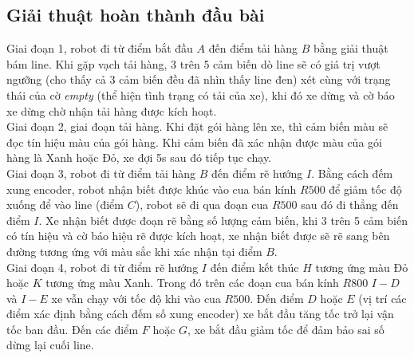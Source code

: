           \subsection{Giải thuật hoàn thành đầu bài}
               \hspace*{0.6cm}Giai đoạn 1, robot đi từ điểm bắt đầu $A$ đến điểm tải hàng $B$ bằng giải thuật bám line. Khi gặp vạch tải hàng, 3 trên 5 cảm biến dò line sẽ có giá trị vượt ngưỡng (cho thấy cả 3 cảm biến đều đã nhìn thấy line đen)
               xét cùng với trạng thái của cờ \textit{empty} (thể hiện tình trạng có tải của xe), khi đó xe dừng và cờ báo xe dừng chờ nhận tải hàng được kích hoạt.\\
               \hspace*{0.6cm}Giai đoạn 2, giai đoạn tải hàng. Khi đặt gói hàng lên xe, thì cảm biến màu sẽ đọc
               tín hiệu màu của gói hàng. Khi cảm biến đã xác nhận được màu của gói hàng là Xanh hoặc
               Đỏ, xe đợi 5s sau đó tiếp tục chạy.\\
               \hspace*{0.6cm}Giai đoạn 3, robot đi từ điểm tải hàng $B$ đến điểm rẽ hướng $I$. Bằng cách đếm xung encoder, robot nhận biết được khúc vào cua bán kính $R500$ để giảm tốc độ xuống để vào line (điểm $C$), robot sẽ đi qua đoạn cua $R500$ sau đó đi thẳng đến điểm $I$. Xe nhận biết
               được đoạn rẽ bằng số lượng cảm biến, khi 3 trên 5 cảm biến có tín hiệu và cờ báo hiệu rẽ được kích hoạt,
               xe nhận biết được sẽ rẽ sang bên đường tương ứng với màu sắc khi xác nhận tại điểm $B$.\\
               \hspace*{0.6cm}Giai đoạn 4, robot đi từ điểm rẽ hướng $I$ đến điểm kết thúc $H$ tương ứng màu Đỏ
               hoặc $K$ tương ứng màu Xanh. Trong đó trên các đoạn cua bán kính $R800$ $I-D$ và $I-E$ xe vẫn chạy với tốc độ khi vào cua $R500$. Đến điểm $D$ hoặc $E$ (vị trí các điểm xác định bằng cách đếm số xung encoder) xe bắt đầu tăng tốc trở lại vận tốc ban đầu. Đến các điểm $F$ hoặc $G$, xe bắt đầu giảm tốc để đảm bảo sai số dừng lại cuối line.
